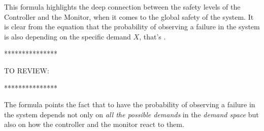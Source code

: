 This formula highlights the deep connection between the safety levels of the Controller and the Monitor, when it comes to the global safety of the system. It is clear from the equation that the probability of observing a failure in the system is also depending on the specific demand $X$, that's 
.\newline

***************\newline

TO REVIEW:\newline

***************\newline

The formula points the fact that to have the probability of observing a failure in the system depends not only on \textsl{all the possible demands} in the \textsl{demand space} but also on how the controller and the monitor react to them.\newline


